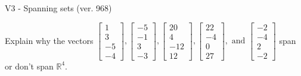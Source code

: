 \begin{exercise}
  \begin{exerciseTitle}V3 - Spanning sets (ver. 968)\end{exerciseTitle}
  \begin{exerciseStatement}
    Explain why the vectors \(\left[\begin{array}{r}
1 \\
3 \\
-5 \\
-4
\end{array}\right] , \left[\begin{array}{r}
-5 \\
-1 \\
3 \\
-3
\end{array}\right] , \left[\begin{array}{r}
20 \\
4 \\
-12 \\
12
\end{array}\right] , \left[\begin{array}{r}
22 \\
-4 \\
0 \\
27
\end{array}\right] , \text{ and } \left[\begin{array}{r}
-2 \\
-4 \\
2 \\
-2
\end{array}\right]\) span or don't span \(\mathbb{R}^4\). 
	



\end{exerciseStatement}
\end{exercise}
